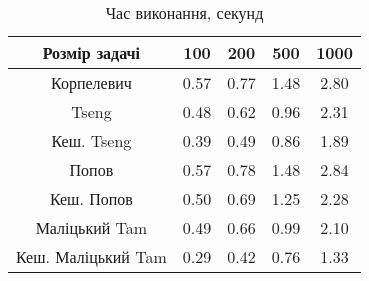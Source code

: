 \begin{table}[H]
	\centering
	\begin{tabular}{|c||c|c|c|c|}\hline
		Розмір задачі & 100 & 200 & 500 & 1000 \\ \hline \hline
		Корпелевич & 0.57 & 0.77 & 1.48 & 2.80 \\ \hline
		Tseng & 0.48 & 0.62 & 0.96 & 2.31 \\ \hline
		Кеш. Tseng & 0.39 & 0.49 & 0.86 & 1.89 \\ \hline
		Попов & 0.57 & 0.78 & 1.48 & 2.84 \\ \hline
		Кеш. Попов & 0.50 & 0.69 & 1.25 & 2.28 \\ \hline
		Маліцький Tam & 0.49 & 0.66 & 0.99 & 2.10 \\ \hline
		Кеш. Маліцький Tam & 0.29 & 0.42 & 0.76 & 1.33 \\ \hline
	\end{tabular}
	\caption{Час виконання, секунд}
\end{table}

